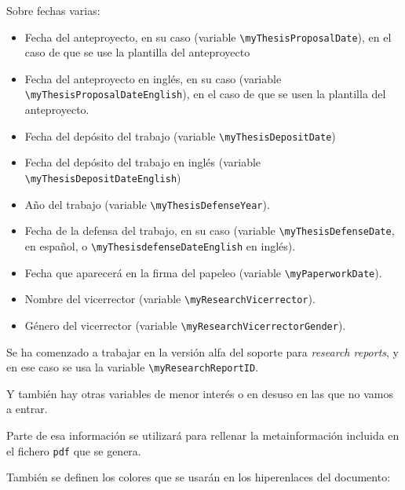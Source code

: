 Sobre fechas varias:

\begin{itemize}
  
  \item Fecha del anteproyecto, en su caso (variable \texttt{\textbackslash{}myThesisProposalDate}), en el caso de que se use la plantilla del anteproyecto
  \item Fecha del anteproyecto en inglés, en su caso (variable \texttt{\textbackslash{}myThesisProposalDateEnglish}), en el caso de que se usen la plantilla del anteproyecto.

  \item Fecha del depósito del trabajo (variable \texttt{\textbackslash{}myThesisDepositDate})
  \item Fecha del depósito del trabajo en inglés (variable \texttt{\textbackslash{}myThesisDepositDateEnglish})

  \item Año del trabajo (variable \texttt{\textbackslash{}myThesisDefenseYear}).
  \item Fecha de la defensa del trabajo, en su caso (variable \texttt{\textbackslash{}myThesisDefenseDate}, en español, o \texttt{\textbackslash{}myThesisdefenseDateEnglish} en inglés).

  \item Fecha que aparecerá en la firma del papeleo (variable \texttt{\textbackslash{}myPaperworkDate}).
  
  \item Nombre del vicerrector (variable \texttt{\textbackslash{}myResearchVicerrector}).
  \item Género del vicerrector (variable \texttt{\textbackslash{}myResearchVicerrectorGender}).
\end{itemize}

Se ha comenzado a trabajar en la versión alfa del soporte para \textit{research reports}, y en ese caso se usa la variable \texttt{\textbackslash{}myResearchReportID}.

Y también hay otras variables de menor interés o en desuso en las que no vamos a entrar.

Parte de esa información se utilizará para rellenar la metainformación incluida en el fichero \texttt{pdf} que se genera.


También se definen los colores que se usarán en los hiperenlaces del documento:

